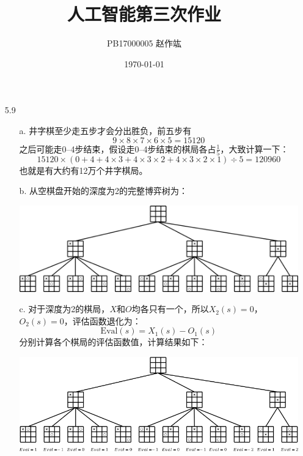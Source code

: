 \documentclass[UTF8,zihao=-4]{ctexart}
\title{\heiti 人工智能\quad 第三次作业}
\author{PB17000005\quad \CJKfontspec{AR PL UKai CN} 赵作竑}
\date{\kaishu \today}
\begin{document}
	\maketitle
	\begin{itemize}
		\item[5.9]
			\begin{enumerate}
				\item[a.] 井字棋至少走五步才会分出胜负，前五步有
				\begin{equation*}
					9 \times 8 \times 7 \times 6 \times 5 = 15120
				\end{equation*} 
				之后可能走0--4步结束，假设走0--4步结束的棋局各占$\frac{1}{5}$，大致计算一下：
				\begin{equation*}
					15120 \times (0+4+4\times 3+4\times 3\times 2+4\times 3\times 2\times 1) \div 5 = 120960
				\end{equation*}
				也就是有大约有12万个井字棋局。
				\item[b.]从空棋盘开始的深度为2的完整博弈树为：
				\begin{center}
					\includegraphics[width=\linewidth]{g59b.png}
				\end{center}
				\item[c.]对于深度为2的棋局，$X$和$O$均各只有一个，所以$X_2(s)=0$，$O_2(s)=0$，评估函数退化为：
				\begin{equation*}
					\text{Eval}(s)=X_1(s)-O_1(s)
				\end{equation*}
				分别计算各个棋局的评估函数值，计算结果如下：
				\begin{center}
					\includegraphics[width=\linewidth]{g59c.png}
				\end{center}

\end{enumerate}
\end{itemize}
\end{document}

